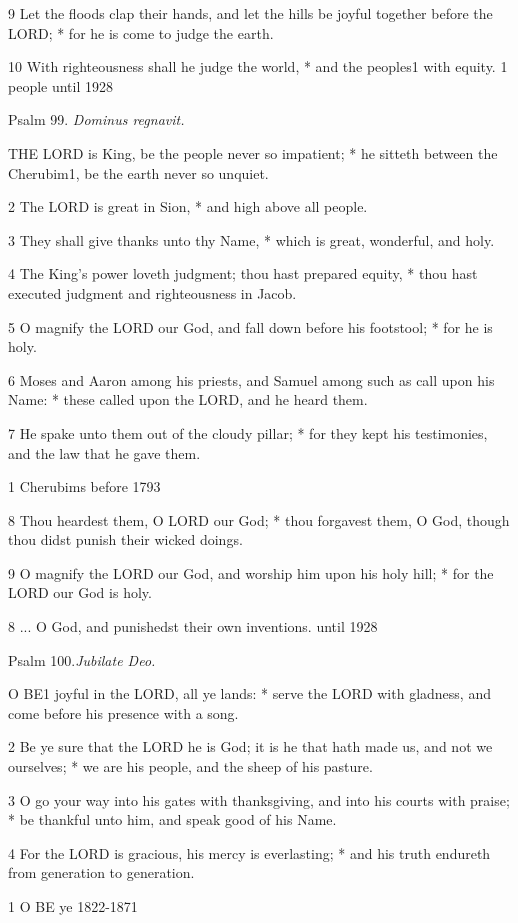 9 Let the floods clap their hands, and let the hills
be joyful together before the LORD; * for he is come to judge the earth.

10 With righteousness shall he judge the world, * and
the peoples1 with equity.
1 people until
1928

Psalm 99. \emph{Dominus regnavit.}

THE
LORD is King, be the people never so impatient; * he sitteth between the
Cherubim1, be the earth never so unquiet.

2 The LORD is great in Sion, * and high above all people.

3 They shall give thanks unto thy Name, * which is
great, wonderful, and holy.

4 The King’s power loveth judgment; thou hast
prepared equity, * thou hast executed judgment and righteousness in
Jacob.

5 O magnify the LORD our God, and fall down before
his footstool; * for he is holy.

6 Moses and Aaron among his priests, and Samuel among
such as call upon his Name: * these called upon the LORD, and he heard
them.

7 He spake unto them out of the cloudy pillar; * for
they kept his testimonies, and the law that he gave them.

1 Cherubims
before 1793

8 Thou heardest them, O LORD our God; * thou forgavest
them, O God, though thou didst punish their wicked doings.

9 O magnify the LORD our God, and worship him upon his
holy hill; * for the LORD our God is holy.

8 ... O God, and punishedst their own inventions. until
1928

Psalm 100.\emph{Jubilate
Deo.}

O
BE1 joyful in the LORD, all ye lands: * serve the LORD with
gladness, and come before his presence with a song.

2 Be ye sure that the LORD he is God; it is he that
hath made us, and not we ourselves; * we are his people, and the sheep
of his pasture.

3 O go your way into his gates with thanksgiving,
and into his courts with praise; * be thankful unto him, and speak good
of his Name.

4 For the LORD is gracious, his mercy is everlasting;
* and his truth endureth from generation to generation.

1 O
BE ye 1822-1871

